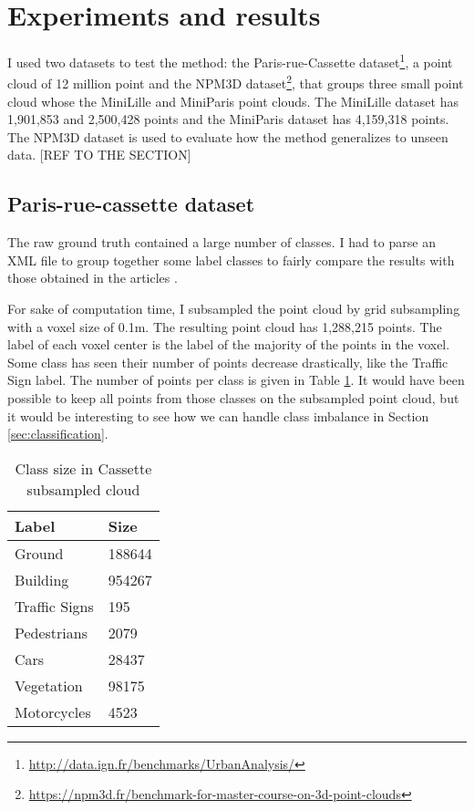 \documentclass{article}
\begin{document}
\section{Experiments and results}
I used two datasets to test the method: the Paris-rue-Cassette dataset\footnote{\url{http://data.ign.fr/benchmarks/UrbanAnalysis/}}, a point cloud of 12 million point and the NPM3D dataset\footnote{\url{https://npm3d.fr/benchmark-for-master-course-on-3d-point-clouds}}, that groups three small point cloud whose the MiniLille and MiniParis point clouds. The MiniLille dataset has 1,901,853 and 2,500,428 points and the MiniParis dataset has 4,159,318 points. The NPM3D dataset is used to evaluate how the method generalizes to unseen data. [REF TO THE SECTION]


\subsection{Paris-rue-cassette dataset}
The raw ground truth contained a large number of classes. I had to parse an XML file to group together some label classes to fairly compare the results with those obtained in the articles \cite{thomas_semantic_2018,hackel_fast_nodate,weinmann_semantic_2015}. 

For sake of computation time, I subsampled the point cloud by grid subsampling with a voxel size of 0.1m. The resulting point cloud has 1,288,215 points. The label of each voxel center is the label of the majority of the points in the voxel. Some class has seen their number of points decrease drastically, like the Traffic Sign label. The number of points per class is given in Table \ref{tab:cassette_label_size}. It would have been possible to keep all points from those classes on the subsampled point cloud, but it would be interesting to see how we can handle class imbalance in Section \ref{sec:classification}.

\begin{table}[H]
    \begin{center}
            \begin{tabular}{ll}
                    Label & Size \\
                    \hline
                    Ground & 188644 \\
                    Building & 954267 \\
                    Traffic Signs & 195 \\
                    Pedestrians & 2079 \\
                    Cars & 28437 \\
                    Vegetation & 98175 \\
                    Motorcycles & 4523 \\
            \end{tabular}
    \end{center}
    \caption{Class size in Cassette subsampled cloud}
    \label{tab:cassette_label_size}
\end{table}
\end{document}
